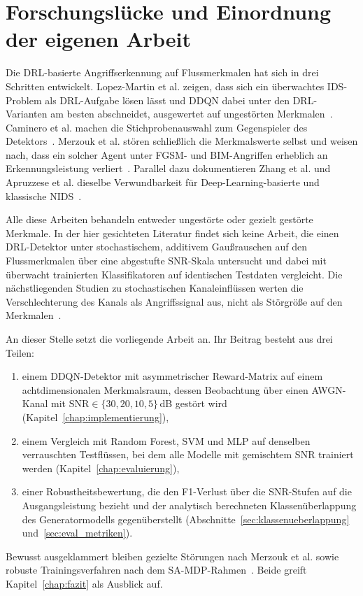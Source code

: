 \section{Forschungslücke und Einordnung der eigenen Arbeit}

Die DRL-basierte Angriffserkennung auf Flussmerkmalen hat sich in drei Schritten entwickelt. Lopez-Martin et al. zeigen, dass sich ein überwachtes IDS-Problem als DRL-Aufgabe lösen lässt und DDQN dabei unter den DRL-Varianten am besten abschneidet, ausgewertet auf ungestörten Merkmalen~\autocite{lopez-martinApplicationDeepReinforcement2020}. Caminero et al. machen die Stichprobenauswahl zum Gegenspieler des Detektors~\autocite{camineroAdversarialEnvironmentReinforcement2019}. Merzouk et al. stören schließlich die Merkmalswerte selbst und weisen nach, dass ein solcher Agent unter FGSM- und BIM-Angriffen erheblich an Erkennungsleistung verliert~\autocite{merzoukEvadingDeepReinforcement2022}. Parallel dazu dokumentieren Zhang et al. und Apruzzese et al. dieselbe Verwundbarkeit für Deep-Learning-basierte und klassische NIDS~\autocite{zhangAdversarialAttacksDeep2022, apruzzeseDeepReinforcementAdversarial2020}.

Alle diese Arbeiten behandeln entweder ungestörte oder gezielt gestörte Merkmale. In der hier gesichteten Literatur findet sich keine Arbeit, die einen DRL-Detektor unter stochastischem, additivem Gaußrauschen auf den Flussmerkmalen über eine abgestufte SNR-Skala untersucht und dabei mit überwacht trainierten Klassifikatoren auf identischen Testdaten vergleicht. Die nächstliegenden Studien zu stochastischen Kanaleinflüssen werten die Verschlechterung des Kanals als Angriffssignal aus, nicht als Störgröße auf den Merkmalen~\autocite{arjouneNovelJammingAttacks2020}.

An dieser Stelle setzt die vorliegende Arbeit an. Ihr Beitrag besteht aus drei Teilen:
\begin{enumerate}
	\item einem DDQN-Detektor mit asymmetrischer Reward-Matrix auf einem achtdimensionalen Merkmalsraum, dessen Beobachtung über einen AWGN-Kanal mit $\mathrm{SNR}\in\{30,20,10,5\}$\,dB gestört wird (Kapitel~\ref{chap:implementierung}),
	\item einem Vergleich mit Random Forest, SVM und MLP auf denselben verrauschten Testflüssen, bei dem alle Modelle mit gemischtem SNR trainiert werden (Kapitel~\ref{chap:evaluierung}),
	\item einer Robustheitsbewertung, die den F1-Verlust über die SNR-Stufen auf die Ausgangsleistung bezieht und der analytisch berechneten Klassenüberlappung des Generatormodells gegenüberstellt (Abschnitte~\ref{sec:klassenueberlappung} und~\ref{sec:eval_metriken}).
\end{enumerate}
Bewusst ausgeklammert bleiben gezielte Störungen nach Merzouk et al. sowie robuste Trainingsverfahren nach dem SA-MDP-Rahmen~\autocite{zhangRobustDeepReinforcement2020}. Beide greift Kapitel~\ref{chap:fazit} als Ausblick auf.
